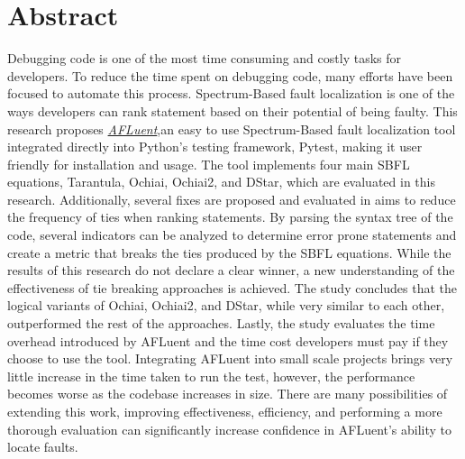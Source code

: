 \chapter*{Abstract}

Debugging code is one of the most time consuming and costly tasks for
developers. To reduce the time spent on debugging code, many efforts have been
focused to automate this process. Spectrum-Based fault localization is one of
the ways developers can rank statement based on their potential of being faulty.
This research proposes \href{https://github.com/noorbuchi/AFLuent}{\emph{AFLuent}},an easy to use Spectrum-Based
fault localization tool integrated directly into Python's testing framework,
Pytest, making it user friendly for installation and usage. The
tool implements four main SBFL equations, Tarantula, Ochiai, Ochiai2, and DStar,
which are evaluated in this research. Additionally, several fixes are
proposed and evaluated in aims to reduce the frequency of ties when ranking
statements. By parsing the syntax tree of the code, several indicators can be
analyzed to determine error prone statements and create a metric that breaks
the ties produced by the SBFL equations. While the results of this research do
not declare a clear winner, a new understanding of the effectiveness of
tie breaking approaches is achieved. The study concludes that the logical
variants of Ochiai, Ochiai2, and DStar, while very similar to each other,
outperformed the rest of the approaches. Lastly, the study evaluates the time
overhead introduced by AFLuent and the time cost developers must pay if they choose
to use the tool. Integrating AFLuent into small scale projects brings very
little increase in the time taken to run the test, however, the performance
becomes worse as the codebase increases in size. There are many possibilities of extending
this work, improving effectiveness, efficiency, and performing
a more thorough evaluation can significantly increase confidence in AFLuent's
ability to locate faults.